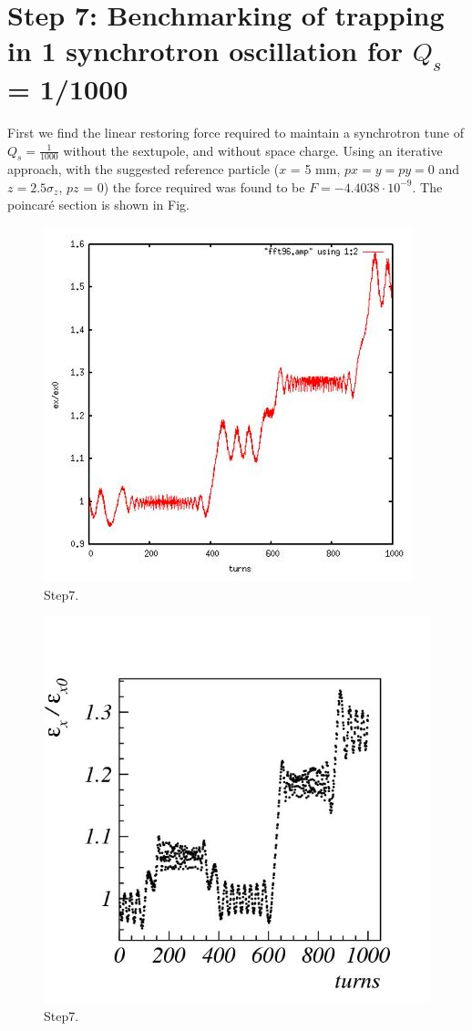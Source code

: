 \documentclass[a4paper]{cernatsnote}
\begin{document}
\section{Step 7: Benchmarking of trapping in 1 synchrotron oscillation for $Q_s$ = 1/1000}

First we find the linear restoring force required to maintain a synchrotron tune of $Q_s = \frac{1}{1000}$ without the sextupole, and without space charge. Using an iterative approach, with the suggested reference particle ($x$ = 5 mm, $px = y = py = 0$ and $z = 2.5 \sigma_z$, $pz$ = 0) the force required was found to be $F = -4.4038 \cdot 10^{-9}$. The poincar\'{e} section is shown in Fig. 

\begin{figure}[!htb]
        \centering
        \includegraphics[width=0.5\columnwidth]{Step7_trapping_MICROMAP.jpg}
        \caption{Step7.}
        \label{fig:step7_m}
\end{figure}

\begin{figure}[!htb]
        \centering
        \includegraphics[width=0.5\columnwidth]{Step7_trapping_SIMPSONS.jpg}
        \caption{Step7.}
        \label{fig:step7_s}
\end{figure}
\end{document}
